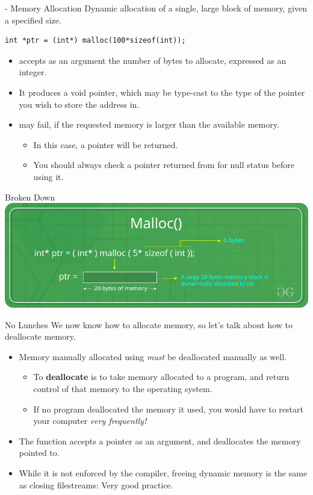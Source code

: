 \documentclass[11pt]{beamer}
\let\OldTexttt\texttt
\renewcommand{\texttt}[1]{\OldTexttt{\color{teal}{#1}}}
\begin{document}
\begin{frame}[fragile=singleslide]{\texttt{malloc()} - Memory Allocation}
Dynamic allocation of a single, large block of memory, given a specified size.
\begin{lstlisting}[style=C]
int *ptr = (int*) malloc(100*sizeof(int));
\end{lstlisting}
\begin{itemize}
\item \texttt{malloc()} accepts as an argument the number of bytes to allocate, expressed as an integer.
\item It produces a void pointer, which may be type-cast to the type of the pointer you wish to store the address in.  
\item \texttt{malloc()} may fail, if the requested memory is larger than the available memory.
\begin{itemize}
\item In this case, a \texttt{NULL} pointer will be returned.
\item You should always check a pointer returned from \texttt{malloc()} for null status before using it.
\end{itemize}
\end{itemize}
\end{frame}

\begin{frame}{\texttt{malloc()} Broken Down}
\center
\includegraphics[scale=0.4]{Malloc-function-in-c.png}
\end{frame}

\begin{frame}{No \texttt{free()} Lunches}
We now know how to allocate memory, so let's talk about how to deallocate memory.
\begin{itemize}
\item Memory manually allocated using \texttt{malloc()} \emph{must} be deallocated manually as well.
\begin{itemize}
	\item To \textbf{deallocate} is to take memory allocated to a program, and return control of that memory to the operating system.  
	\item If no program deallocated the memory it used, you would have to restart your computer \emph{very frequently!}
\end{itemize}
\item The \texttt{free()} function accepts a pointer as an argument, and deallocates the memory pointed to.
\item While it is not enforced by the compiler, freeing dynamic memory is the same as closing filestreams: Very good practice.  
\end{itemize}
\end{frame}
\end{document}

